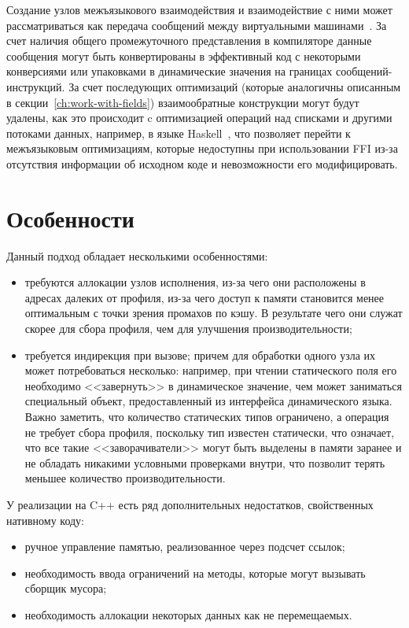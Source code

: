 \documentclass[times
]{itmo-student-thesis}
\begin{document}
Создание узлов межъязыкового взаимодействия и взаимодействие с ними может рассматриваться как передача сообщений между виртуальными машинами~\cite{graalvm-polyglot}. За счет наличия общего промежуточного представления в компиляторе данные сообщения могут быть конвертированы в эффективный код с некоторыми конверсиями или упаковками в динамические значения на границах сообщений-инструкций. За счет последующих оптимизаций (которые аналогичны описанным в секции~\ref{ch:work-with-fields}) взаимообратные конструкции могут будут удалены, как это происходит c оптимизацией операций над списками и другими потоками данных, например, в языке Haskell~\cite{streamfusion}, что позволяет перейти к межъязыковым оптимизациям, которые недоступны при использовании FFI из-за отсутствия информации об исходном коде и невозможности его модифицировать.

\section{Особенности}
Данный подход обладает несколькими особенностями:
\begin{itemize}
	\item требуются аллокации узлов исполнения, из-за чего они расположены в адресах далеких от профиля, из-за чего доступ к памяти становится менее оптимальным с точки зрения промахов по кэшу. В результате чего они служат скорее для сбора профиля, чем для улучшения производительности;
	\item требуется индирекция при вызове; причем для обработки одного узла их может потребоваться несколько: например, при чтении статического поля его необходимо <<завернуть>> в динамическое значение, чем может заниматься специальный объект, предоставленный из интерфейса динамического языка. Важно заметить, что количество статических типов ограничено, а операция не требует сбора профиля, поскольку тип известен статически, что означает, что все такие <<заворачиватели>> могут быть выделены в памяти заранее и не обладать никакими условными проверками внутри, что позволит терять меньшее количество производительности.
\end{itemize}

У реализации на C++ есть ряд дополнительных недостатков, свойственных нативному коду:
\begin{itemize}
	\item ручное управление памятью, реализованное через подсчет ссылок;
	\item необходимость ввода ограничений на методы, которые могут вызывать сборщик мусора;
	\item необходимость аллокации некоторых данных как не перемещаемых.
\end{itemize}
\end{document}
